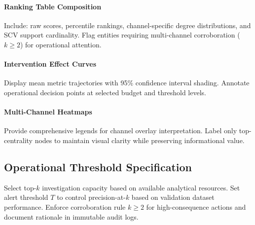 \documentclass[12pt]{article}
\theoremstyle{plain}
\begin{document}
\paragraph{Ranking Table Composition}
Include: raw scores, percentile rankings, channel-specific degree distributions, and SCV support cardinality. Flag entities requiring multi-channel corroboration ($k\ge2$) for operational attention.

\paragraph{Intervention Effect Curves}
Display mean metric trajectories with 95\% confidence interval shading. Annotate operational decision points at selected budget and threshold levels.

\paragraph{Multi-Channel Heatmaps}
Provide comprehensive legends for channel overlay interpretation. Label only top-centrality nodes to maintain visual clarity while preserving informational value.

\subsection{Operational Threshold Specification}
Select top-$k$ investigation capacity based on available analytical resources. Set alert threshold $T$ to control precision-at-$k$ based on validation dataset performance. Enforce corroboration rule $k\ge2$ for high-consequence actions and document rationale in immutable audit logs.
\end{document}
